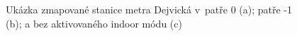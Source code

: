                       \begin{figure}
                    	  \centering
                    \hfill
                    \hfill

                    \caption{Ukázka zmapované stanice metra Dejvická v~patře 0 (a); patře -1 (b); a bez aktivovaného indoor módu (c)}
                    \label{obr41}
                    \end{figure}
                    


